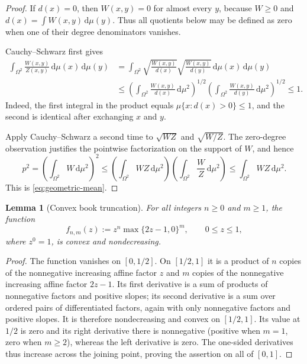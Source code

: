 \documentclass[11pt]{article}
\newtheorem{lemma}[theorem]{Lemma}
\newcommand{\dd}{\,\mathrm{d}}
\begin{document}
\begin{proof}
If $d(x)=0$, then $W(x,y)=0$ for almost every $y$, because $W\geq0$ and
$d(x)=\int W(x,y)\dd\mu(y)$.  Thus all quotients below may be defined as
zero when one of their degree denominators vanishes.

Cauchy--Schwarz first gives
\begin{align*}
 \int_{\Omega^2}\frac{W(x,y)}{Z(x,y)}\dd\mu(x)\dd\mu(y)
 &=\int_{\Omega^2}
   \sqrt{\frac{W(x,y)}{d(x)}}
   \sqrt{\frac{W(x,y)}{d(y)}}
   \dd\mu(x)\dd\mu(y)
 \\
 &\leq
 \left(\int_{\Omega^2}\frac{W(x,y)}{d(x)}\dd\mu^2\right)^{1/2}
 \left(\int_{\Omega^2}\frac{W(x,y)}{d(y)}\dd\mu^2\right)^{1/2}
 \leq1.
\end{align*}
Indeed, the first integral in the product equals
$\mu\{x:d(x)>0\}\leq1$, and the second is identical after exchanging
$x$ and $y$.

Apply Cauchy--Schwarz a second time to
$\sqrt{WZ}$ and $\sqrt{W/Z}$.  The zero-degree observation justifies the
pointwise factorization on the support of $W$, and hence
\[
 p^2
 =\left(\int_{\Omega^2}W\dd\mu^2\right)^2
 \leq
 \left(\int_{\Omega^2}WZ\dd\mu^2\right)
 \left(\int_{\Omega^2}\frac WZ\dd\mu^2\right)
 \leq\int_{\Omega^2}WZ\dd\mu^2.
\]
This is \eqref{eq:geometric-mean}.
\end{proof}

\begin{lemma}[Convex book truncation]
\label{lem:convex-truncation}
For all integers $n\geq0$ and $m\geq1$, the function
\[
 f_{n,m}(z):=z^n\max\{2z-1,0\}^m,
 \qquad 0\leq z\leq1,
\]
where $z^0=1$, is convex and nondecreasing.
\end{lemma}

\begin{proof}
The function vanishes on $[0,1/2]$.  On $[1/2,1]$ it is a product of
$n$ copies of the nonnegative increasing affine factor $z$ and $m$ copies
of the nonnegative increasing affine factor $2z-1$.  Its first derivative
is a sum of products of nonnegative factors and positive slopes; its second
derivative is a sum over ordered pairs of differentiated factors, again
with only nonnegative factors and positive slopes.  It is therefore
nondecreasing and convex on $[1/2,1]$.  Its value at $1/2$ is zero and its
right derivative there is nonnegative (positive when $m=1$, zero when
$m\geq2$), whereas the left derivative is zero.  The one-sided derivatives
thus increase across the joining point, proving the assertion on all of
$[0,1]$.
\end{proof}
\end{document}

